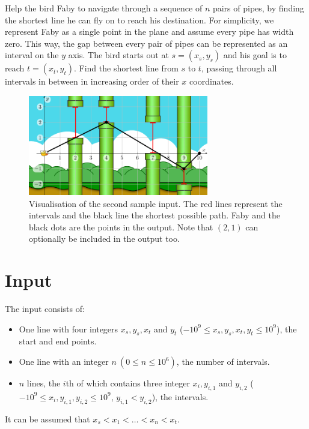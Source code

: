 
Help the bird Faby to navigate through a sequence of $n$ pairs of pipes, by finding the shortest line he can fly on to reach his destination. For simplicity, we represent Faby as a single point in the plane and assume every pipe has width zero. This way, the gap between every pair of pipes can be represented as an interval on the $y$ axis. The bird starts out at $s = (x_s, y_s)$ and his goal is to reach $t = (x_t, y_t)$. Find the shortest line from $s$ to $t$, passing through all intervals in between in increasing order of their $x$ coordinates.

\begin{figure}[!h]
  \centering
  \includegraphics[width=0.7\textwidth]{sample2}
  \caption{Visualisation of the second sample input. The red lines represent the intervals and the black line the shortest possible path. Faby and the black dots are the points in the output. Note that $(2, 1)$ can optionally be included in the output too.}
\end{figure}

\section*{Input}
The input consists of:
\begin{itemize}
	\item One line with four integers $x_s, y_s, x_t$ and $y_t$ ($-10^9 \le x_s, y_s, x_t, y_t \le 10^9$), the start and end points.
	\item One line with an integer $n\ (0 \le n \le 10^6)$, the number of intervals.
	\item $n$ lines, the $i$th of which contains three integer $x_i, y_{i,1}$ and $y_{i,2}$ ($-10^9 \le x_i, y_{i, 1}, y_{i, 2} \le 10^9$, $y_{i, 1} < y_{i, 2}$), the intervals.
\end{itemize}
It can be assumed that $x_s < x_1 < \dots < x_n < x_t$.

